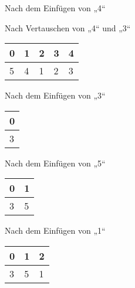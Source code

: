 \documentclass{lehramt-informatik-aufgabe}
\begin{document}
\begin{enumerate}
\begin{enumerate}
\begin{liDiagramm}{Nach dem Einfügen von „4“}
\end{liDiagramm}

\begin{liDiagramm}{Nach Vertauschen von „4“ und „3“}
\begin{tabular}{lllll}
\bf{0} & \bf{1} & \bf{2} & \bf{3} & \bf{4} \\
\hline
5      & 4      & 1      & 2      & 3      \\
\end{tabular}

\end{liDiagramm}

%


\begin{liDiagramm}{Nach dem Einfügen von „3“}
\begin{tabular}{l}
\bf{0} \\
\hline
3      \\
\end{tabular}

\end{liDiagramm}

\begin{liDiagramm}{Nach dem Einfügen von „5“}
\begin{tabular}{ll}
\bf{0} & \bf{1} \\
\hline
3      & 5      \\
\end{tabular}

\end{liDiagramm}

\begin{liDiagramm}{Nach dem Einfügen von „1“}
\begin{tabular}{lll}
\bf{0} & \bf{1} & \bf{2} \\
\hline
3      & 5      & 1      \\
\end{tabular}


\end{liDiagramm}
\end{enumerate}
\end{enumerate}
\end{document}
